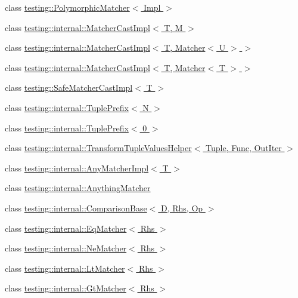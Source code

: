 \begin{DoxyCompactItemize}
\item 
class \hyperlink{classtesting_1_1_polymorphic_matcher}{testing\+::\+Polymorphic\+Matcher$<$ Impl $>$}
\item 
class \hyperlink{classtesting_1_1internal_1_1_matcher_cast_impl}{testing\+::internal\+::\+Matcher\+Cast\+Impl$<$ T, M $>$}
\item 
class \hyperlink{classtesting_1_1internal_1_1_matcher_cast_impl_3_01_t_00_01_matcher_3_01_u_01_4_01_4}{testing\+::internal\+::\+Matcher\+Cast\+Impl$<$ T, Matcher$<$ U $>$ $>$}
\item 
class \hyperlink{classtesting_1_1internal_1_1_matcher_cast_impl_3_01_t_00_01_matcher_3_01_t_01_4_01_4}{testing\+::internal\+::\+Matcher\+Cast\+Impl$<$ T, Matcher$<$ T $>$ $>$}
\item 
class \hyperlink{classtesting_1_1_safe_matcher_cast_impl}{testing\+::\+Safe\+Matcher\+Cast\+Impl$<$ T $>$}
\item 
class \hyperlink{classtesting_1_1internal_1_1_tuple_prefix}{testing\+::internal\+::\+Tuple\+Prefix$<$ N $>$}
\item 
class \hyperlink{classtesting_1_1internal_1_1_tuple_prefix_3_010_01_4}{testing\+::internal\+::\+Tuple\+Prefix$<$ 0 $>$}
\item 
class \hyperlink{classtesting_1_1internal_1_1_transform_tuple_values_helper}{testing\+::internal\+::\+Transform\+Tuple\+Values\+Helper$<$ Tuple, Func, Out\+Iter $>$}
\item 
class \hyperlink{classtesting_1_1internal_1_1_any_matcher_impl}{testing\+::internal\+::\+Any\+Matcher\+Impl$<$ T $>$}
\item 
class \hyperlink{classtesting_1_1internal_1_1_anything_matcher}{testing\+::internal\+::\+Anything\+Matcher}
\item 
class \hyperlink{classtesting_1_1internal_1_1_comparison_base}{testing\+::internal\+::\+Comparison\+Base$<$ D, Rhs, Op $>$}
\item 
class \hyperlink{classtesting_1_1internal_1_1_eq_matcher}{testing\+::internal\+::\+Eq\+Matcher$<$ Rhs $>$}
\item 
class \hyperlink{classtesting_1_1internal_1_1_ne_matcher}{testing\+::internal\+::\+Ne\+Matcher$<$ Rhs $>$}
\item 
class \hyperlink{classtesting_1_1internal_1_1_lt_matcher}{testing\+::internal\+::\+Lt\+Matcher$<$ Rhs $>$}
\item 
class \hyperlink{classtesting_1_1internal_1_1_gt_matcher}{testing\+::internal\+::\+Gt\+Matcher$<$ Rhs $>$}
\item 

\end{DoxyCompactItemize}

